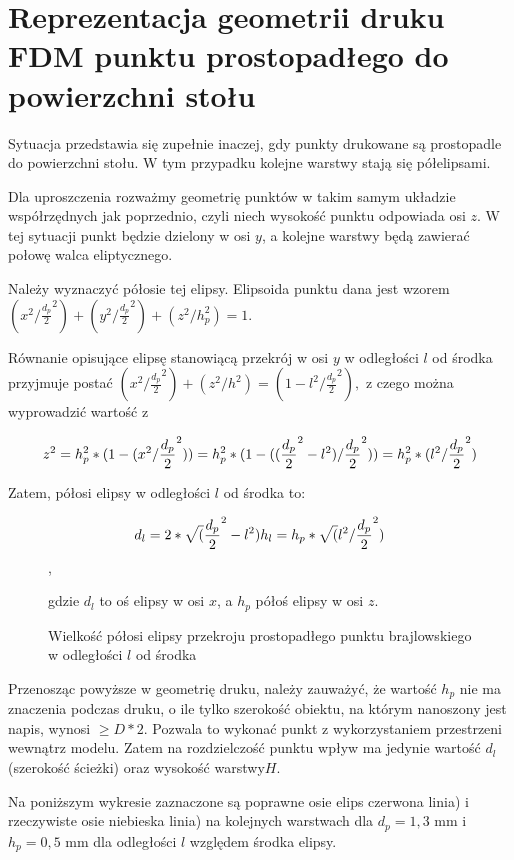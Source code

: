 \documentclass[12pt,a4paper]{article}
\begin{document}
\section{Reprezentacja geometrii druku FDM punktu prostopadłego do powierzchni stołu}
Sytuacja przedstawia się zupełnie inaczej, gdy punkty drukowane są prostopadle do powierzchni stołu. W tym przypadku kolejne warstwy stają się półelipsami.

Dla uproszczenia rozważmy geometrię punktów w takim samym układzie współrzędnych jak poprzednio, czyli niech wysokość punktu odpowiada osi $z$. W tej sytuacji punkt będzie dzielony w osi $y$, a kolejne warstwy będą zawierać połowę walca eliptycznego.

Należy wyznaczyć półosie tej elipsy.
Elipsoida punktu dana jest wzorem
$(x^2 / \frac{d_p}{2}^2) + (y^2 / \frac{d_p}{2}^2) + (z^2 / h_p^2) = 1$.

Równanie opisujące elipsę stanowiącą przekrój w osi $y$ w odległości $l$ od środka przyjmuje postać
$(x^2 / \frac{d_p}{2}^2) + (z^2 / h^2) = (1 - l^2 / \frac{d_p}{2}^2),$
z czego można wyprowadzić wartość z

$$
z^2 = h_p^2 * (1 - (x^2 / \frac{d_p}{2}^2)) = \\
h_p^2 * (1 - ((\frac{d_p}{2}^2 - l^2) / \frac{d_p}{2}^2)) = \\
h_p^2 * (l^2 / \frac{d_p}{2}^2)
$$

Zatem, półosi elipsy w odległości $l$ od środka to:

\begin{figure}
$$
d_l = 2 * \sqrt(\frac{d_p}{2}^2 - l^2) \\
h_l = h_p * \sqrt(l^2 / \frac{d_p}{2}^2)
$$,

gdzie $d_l$ to oś elipsy w osi $x$, a $h_p$ półoś elipsy w osi $z$.
\caption{Wielkość półosi elipsy przekroju prostopadłego punktu brajlowskiego w odległości $l$ od środka}
\end{figure}

Przenosząc powyższe w geometrię druku, należy zauważyć, że wartość $h_p$ nie ma znaczenia podczas druku, o ile tylko szerokość obiektu, na którym nanoszony jest napis, wynosi $\geq D*2$. Pozwala to wykonać punkt z wykorzystaniem przestrzeni wewnątrz modelu.
Zatem na rozdzielczość punktu wpływ ma jedynie wartość $d_l$ (szerokość ścieżki) oraz wysokość warstwy$H$.

Na poniższym wykresie zaznaczone są poprawne osie elips czerwona linia) i rzeczywiste osie niebieska linia) na kolejnych warstwach dla $d_p = 1{,}3 \text{ mm}$ i $h_p = 0{,}5 \text{ mm}$ dla odległości $l$ względem środka elipsy.
\end{document}
